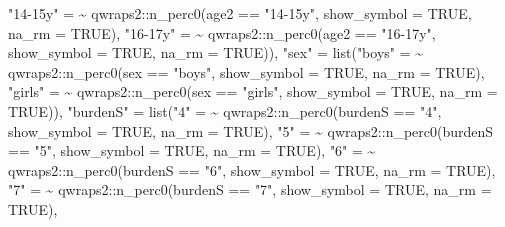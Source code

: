 \documentclass[
]{article}
\newenvironment{Shaded}{\begin{snugshade}}{\end{snugshade}}
\newcommand{\AttributeTok}[1]{\textcolor[rgb]{0.77,0.63,0.00}{#1}}
\newcommand{\ConstantTok}[1]{\textcolor[rgb]{0.00,0.00,0.00}{#1}}
\newcommand{\ErrorTok}[1]{\textcolor[rgb]{0.64,0.00,0.00}{\textbf{#1}}}
\newcommand{\FunctionTok}[1]{\textcolor[rgb]{0.00,0.00,0.00}{#1}}
\newcommand{\NormalTok}[1]{#1}
\newcommand{\OtherTok}[1]{\textcolor[rgb]{0.56,0.35,0.01}{#1}}
\newcommand{\SpecialCharTok}[1]{\textcolor[rgb]{0.00,0.00,0.00}{#1}}
\newcommand{\StringTok}[1]{\textcolor[rgb]{0.31,0.60,0.02}{#1}}
\begin{document}
\begin{Shaded}
\begin{Highlighting}[]
            \StringTok{"14{-}15y"} \OtherTok{=} \ErrorTok{\textasciitilde{}}\NormalTok{ qwraps2}\SpecialCharTok{::}\FunctionTok{n\_perc0}\NormalTok{(age2 }\SpecialCharTok{==} \StringTok{"14{-}15y"}\NormalTok{, }\AttributeTok{show\_symbol =} \ConstantTok{TRUE}\NormalTok{, }\AttributeTok{na\_rm =} \ConstantTok{TRUE}\NormalTok{),}
            \StringTok{"16{-}17y"} \OtherTok{=} \ErrorTok{\textasciitilde{}}\NormalTok{ qwraps2}\SpecialCharTok{::}\FunctionTok{n\_perc0}\NormalTok{(age2 }\SpecialCharTok{==} \StringTok{"16{-}17y"}\NormalTok{, }\AttributeTok{show\_symbol =} \ConstantTok{TRUE}\NormalTok{, }\AttributeTok{na\_rm =} \ConstantTok{TRUE}\NormalTok{)),}
       \StringTok{"sex"} \OtherTok{=} 
       \FunctionTok{list}\NormalTok{(}\StringTok{"boys"} \OtherTok{=} \ErrorTok{\textasciitilde{}}\NormalTok{ qwraps2}\SpecialCharTok{::}\FunctionTok{n\_perc0}\NormalTok{(sex }\SpecialCharTok{==} \StringTok{"boys"}\NormalTok{, }\AttributeTok{show\_symbol =} \ConstantTok{TRUE}\NormalTok{, }\AttributeTok{na\_rm =} \ConstantTok{TRUE}\NormalTok{),}
            \StringTok{"girls"} \OtherTok{=} \ErrorTok{\textasciitilde{}}\NormalTok{ qwraps2}\SpecialCharTok{::}\FunctionTok{n\_perc0}\NormalTok{(sex }\SpecialCharTok{==} \StringTok{"girls"}\NormalTok{, }\AttributeTok{show\_symbol =} \ConstantTok{TRUE}\NormalTok{, }\AttributeTok{na\_rm =} \ConstantTok{TRUE}\NormalTok{)),}
      \StringTok{"burdenS"} \OtherTok{=} 
       \FunctionTok{list}\NormalTok{(}\StringTok{"4"} \OtherTok{=} \ErrorTok{\textasciitilde{}}\NormalTok{ qwraps2}\SpecialCharTok{::}\FunctionTok{n\_perc0}\NormalTok{(burdenS }\SpecialCharTok{==} \StringTok{"4"}\NormalTok{, }\AttributeTok{show\_symbol =} \ConstantTok{TRUE}\NormalTok{, }\AttributeTok{na\_rm =} \ConstantTok{TRUE}\NormalTok{),}
            \StringTok{"5"} \OtherTok{=} \ErrorTok{\textasciitilde{}}\NormalTok{ qwraps2}\SpecialCharTok{::}\FunctionTok{n\_perc0}\NormalTok{(burdenS }\SpecialCharTok{==} \StringTok{"5"}\NormalTok{, }\AttributeTok{show\_symbol =} \ConstantTok{TRUE}\NormalTok{, }\AttributeTok{na\_rm =} \ConstantTok{TRUE}\NormalTok{),}
            \StringTok{"6"} \OtherTok{=} \ErrorTok{\textasciitilde{}}\NormalTok{ qwraps2}\SpecialCharTok{::}\FunctionTok{n\_perc0}\NormalTok{(burdenS }\SpecialCharTok{==} \StringTok{"6"}\NormalTok{, }\AttributeTok{show\_symbol =} \ConstantTok{TRUE}\NormalTok{, }\AttributeTok{na\_rm =} \ConstantTok{TRUE}\NormalTok{),}
            \StringTok{"7"} \OtherTok{=} \ErrorTok{\textasciitilde{}}\NormalTok{ qwraps2}\SpecialCharTok{::}\FunctionTok{n\_perc0}\NormalTok{(burdenS }\SpecialCharTok{==} \StringTok{"7"}\NormalTok{, }\AttributeTok{show\_symbol =} \ConstantTok{TRUE}\NormalTok{, }\AttributeTok{na\_rm =} \ConstantTok{TRUE}\NormalTok{),}

\end{Highlighting}
\end{Shaded}
\end{document}
